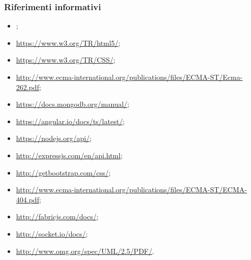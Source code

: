 \documentclass[a4paper, titlepage]{article}
\begin{document}
	\subsubsection{Riferimenti informativi}
	\begin{itemize}
		\item {} \Gldoc;
		
		\item {} \newline \url{https://www.w3.org/TR/html5/};
		
		\item {} \newline \url{https://www.w3.org/TR/CSS/};
		
		\item {} \newline \url{http://www.ecma-international.org/publications/files/ECMA-ST/Ecma-262.pdf};
		
		\item {} \newline \url{https://docs.mongodb.org/manual/};
		
		\item {} \newline \url{https://angular.io/docs/ts/latest/};
		
		\item {} \newline \url{https://nodejs.org/api/};
		
		\item {} \newline \url{http://expressjs.com/en/api.html};
		
		\item {} \newline \url{http://getbootstrap.com/css/};
		
		\item {} \newline \url{http://www.ecma-international.org/publications/files/ECMA-ST/ECMA-404.pdf};
		
		\item {} \newline \url{http://fabricjs.com/docs/};
		
		\item {} \newline \url{http://socket.io/docs/};
		
		\item {} \newline \url{http://www.omg.org/spec/UML/2.5/PDF/}. 
		
	\end{itemize}
		
\end{document}
